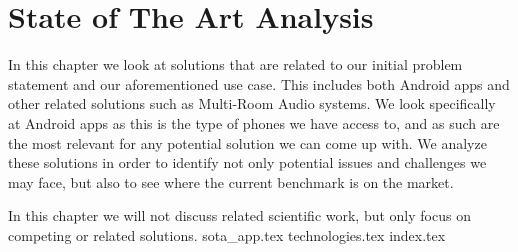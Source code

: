 \chapter{State of The Art Analysis}\label{cha:sota}
In this chapter we look at solutions that are related to our initial problem statement and our aforementioned use case.
This includes both Android apps and other related solutions such as Multi-Room Audio systems.
We look specifically at Android apps as this is the type of phones we have access to, and as such are the most relevant for any potential solution we can come up with.
We analyze these solutions in order to identify not only potential issues and challenges we may face, but also to see where the current benchmark is on the market.

In this chapter we will not discuss related scientific work, but only focus on competing or related solutions.
{sota_app.tex}
{technologies.tex}
{index.tex}
